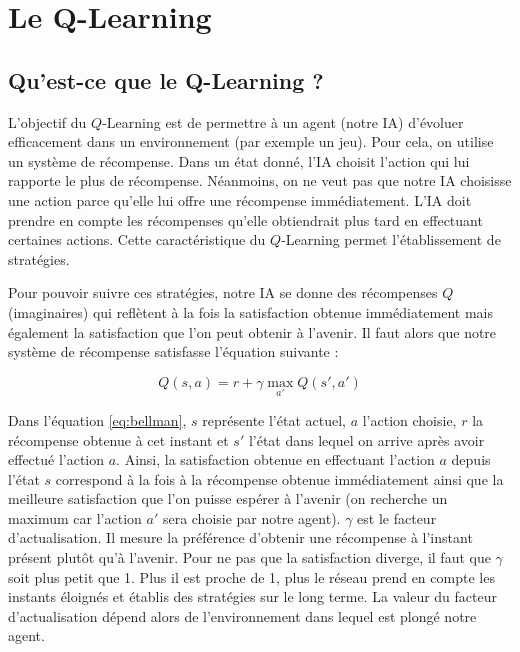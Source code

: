 \section{Le Q-Learning}

\subsection{Qu'est-ce que le Q-Learning ?}

L'objectif du $Q$-Learning est de permettre à un agent (notre IA) d'évoluer efficacement dans un environnement (par exemple un jeu). Pour cela, on utilise un système de
récompense. Dans un état donné, l'IA choisit l'action qui lui rapporte le plus de récompense. Néanmoins, on ne veut pas que notre IA choisisse une action parce qu'elle
lui offre une récompense immédiatement. L'IA doit prendre en compte les récompenses qu'elle obtiendrait plus tard en effectuant certaines actions. Cette 
caractéristique du $Q$-Learning permet l'établissement de stratégies.

Pour pouvoir suivre ces stratégies, notre IA se donne des récompenses $Q$ (imaginaires) qui reflètent à la fois la satisfaction obtenue immédiatement mais également
la satisfaction que l'on peut obtenir à l'avenir. Il faut alors que notre système de récompense satisfasse l'équation suivante : 

\begin{equation}
 Q\left(s,a\right) = r + \gamma \max_{a'} Q\left(s',a'\right)
 \label{eq:bellman}
\end{equation}

Dans l'équation \ref{eq:bellman}, $s$ représente l'état actuel, $a$ l'action choisie, $r$ la récompense obtenue à cet instant et $s'$ l'état dans lequel on arrive
après avoir effectué l'action $a$. Ainsi, la satisfaction obtenue en effectuant l'action $a$ depuis l'état $s$ correspond à la fois à la récompense obtenue immédiatement
ainsi que la meilleure satisfaction que l'on puisse espérer à l'avenir (on recherche un maximum car l'action $a'$ sera choisie par notre agent). $\gamma$ est le facteur
d'actualisation. Il mesure la préférence d'obtenir une récompense à l'instant présent plutôt qu'à l'avenir. Pour ne pas que la satisfaction diverge, il faut que $\gamma$
soit plus petit que 1. Plus il est proche de 1, plus le réseau prend en compte les instants éloignés et établis des stratégies sur le long terme. La valeur du facteur
d'actualisation dépend alors de l'environnement dans lequel est plongé notre agent.


